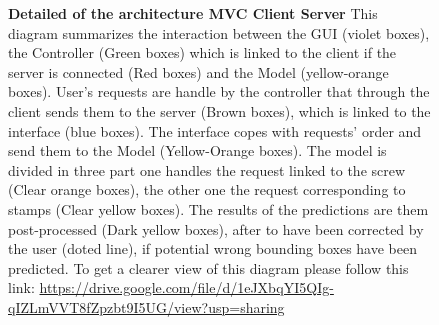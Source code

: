 \documentclass[12pt, french, a4paper]{article} %
\newcommand{\link}[1]{{\color{Blue}\scriptsize\href{#1}{#1}}}
\begin{document}
\begin{landscape}
\begin{figure}[H]
 \caption{\textbf{Detailed of the architecture \gls{MVC} Client Server} This diagram summarizes the interaction between the \gls{GUI} (violet boxes), the Controller (Green boxes) which is linked to the client if the server is connected (Red boxes) and the Model (yellow-orange boxes). User's requests are handle by the controller that through the client sends them to the server (Brown boxes), which is linked to the interface (blue boxes). The interface copes with requests' order and send them to the Model (Yellow-Orange boxes). The model is divided in three part one handles the request linked to the screw (Clear orange boxes), the other one the request corresponding to stamps (Clear yellow boxes). The results of the predictions are them post-processed (Dark yellow boxes), after to have been corrected by the user (doted line), if potential wrong bounding boxes have been predicted. To get a clearer view of this diagram please follow this link: \link{https://drive.google.com/file/d/1eJXbqYI5QIg-qIZLmVVT8fZpzbt9I5UG/view?usp=sharing} }
 \label{MVC_SCA}
\end{figure}
\end{landscape}

\\

\newpage
\end{document}
